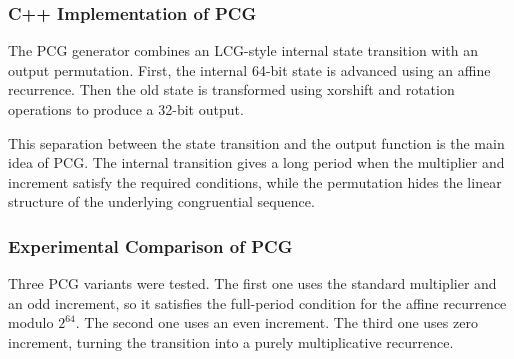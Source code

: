 \subsubsection{C++ Implementation of PCG}

The PCG generator combines an LCG-style internal state transition with an output permutation. First, the internal 64-bit state is advanced using an affine recurrence. Then the old state is transformed using xorshift and rotation operations to produce a 32-bit output.


This separation between the state transition and the output function is the main idea of PCG. The internal transition gives a long period when the multiplier and increment satisfy the required conditions, while the permutation hides the linear structure of the underlying congruential sequence.

\subsubsection{Experimental Comparison of PCG}

Three PCG variants were tested. The first one uses the standard multiplier and an odd increment, so it satisfies the full-period condition for the affine recurrence modulo $2^{64}$. The second one uses an even increment. The third one uses zero increment, turning the transition into a purely multiplicative recurrence.

\begin{table}[htbp]
\centering
\small
{}
\caption{PCG parameter sets used in the experiment}
\label{tab:pcg-parameters}
\end{table}

